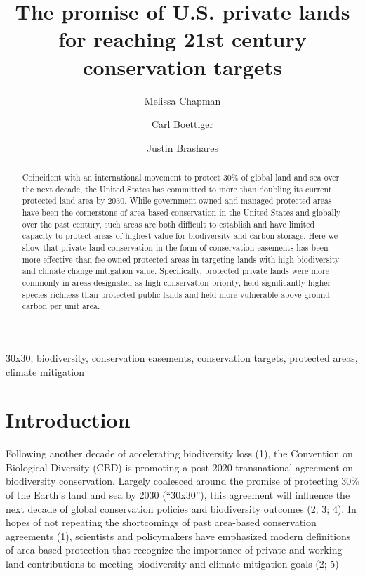 \documentclass[3p]{elsarticle} %
\begin{document}
\begin{frontmatter}

  \title{The promise of U.S. private lands for reaching 21st century
conservation targets}
    \author[espm]{Melissa Chapman}
  
    \author[espm]{Carl Boettiger}
  
    \author[espm]{Justin Brashares}
  
      \address[espm]{Dept. of Environmental Science, Policy, and
Management, University of California Berkeley, Berkeley, CA, USA}
    
  \begin{abstract}
  Coincident with an international movement to protect 30\% of global
  land and sea over the next decade, the United States has committed to
  more than doubling its current protected land area by 2030. While
  government owned and managed protected areas have been the cornerstone
  of area-based conservation in the United States and globally over the
  past century, such areas are both difficult to establish and have
  limited capacity to protect areas of highest value for biodiversity
  and carbon storage. Here we show that private land conservation in the
  form of conservation easements has been more effective than fee-owned
  protected areas in targeting lands with high biodiversity and climate
  change mitigation value. Specifically, protected private lands were
  more commonly in areas designated as high conservation priority, held
  significantly higher species richness than protected public lands and
  held more vulnerable above ground carbon per unit area.
  \end{abstract}
   \begin{keyword} 30x30, biodiversity, conservation
easements, conservation targets, protected areas, climate
mitigation\end{keyword}
 \end{frontmatter}

\hypertarget{introduction}{%
\section{Introduction}\label{introduction}}

Following another decade of accelerating biodiversity loss (1), the
Convention on Biological Diversity (CBD) is promoting a post-2020
transnational agreement on biodiversity conservation. Largely coalesced
around the promise of protecting 30\% of the Earth's land and sea by
2030 (``30x30''), this agreement will influence the next decade of
global conservation policies and biodiversity outcomes (2; 3; 4). In
hopes of not repeating the shortcomings of past area-based conservation
agreements (1), scientists and policymakers have emphasized modern
definitions of area-based protection that recognize the importance of
private and working land contributions to meeting biodiversity and
climate mitigation goals (2; 5)
\end{document}
